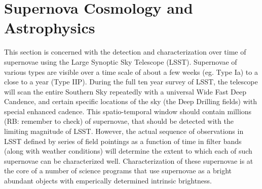%
%
%
%
%
%
%

\section{Supernova Cosmology and Astrophysics}
\label{sec:cosmology, supernovae, classification, lenstimedelays, deepdrillingfields } %




This section is concerned with the detection and characterization over time of 
supernovae using the Large Synoptic Sky Telescope (LSST). Supernovae of various types are visible over a time scale of about a few weeks (eg. Type Ia) to a
 close to a year (Type IIP). During the full ten year survey of LSST, the telescope will scan the entire Southern Sky repeatedly with a universal Wide Fast Deep
 Candence, and certain specific locations of the sky (the Deep Drilling fields)  with special enhanced cadence. This spatio-temporal window should contain 
millions (RB: remember to check) of supernovae, that should be detected with the
 limiting magnitude of LSST. However, the actual sequence of observations in LSST defined by series of field pointings as a function of time in filter bands
 (along with weather conditions) will determine the extent to which each of such supernovae can be characterized well. Characterization of these supernovae is at the core of a number of science programs that use supernovae as a bright abundant objects with emperically determined intrinsic brightness. 

